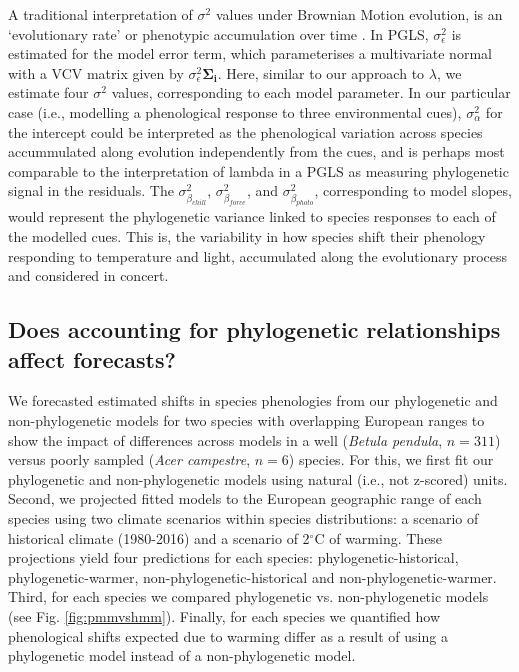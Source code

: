 \documentclass[11pt]{article}
\begin{document}
A traditional interpretation of $\sigma^2$ values under Brownian Motion evolution, is an `evolutionary rate' or phenotypic accumulation over time \citep{revell2008phylogenetic}. In PGLS, $\sigma_\epsilon^2$ is estimated for the model error term, which parameterises a multivariate normal with a VCV matrix given by $\sigma_\epsilon^2$$\boldsymbol{\Sigma_i}$. Here, similar to our approach to $\lambda$, we estimate four $\sigma^2$ values, corresponding to each model parameter. In our particular case (i.e., modelling a phenological response to three environmental cues), $\sigma_\alpha^2$ for the intercept could be interpreted as the phenological variation across species accummulated along evolution independently from the cues, and is perhaps most comparable to the interpretation of lambda in a PGLS as measuring phylogenetic signal in the residuals. The $\sigma_{\beta_{chill}}^2$, $\sigma_{\beta_{force}}^2$, and $\sigma_{\beta_{photo}}^2$, corresponding to model slopes, would represent the phylogenetic variance linked to species responses to each of the modelled cues. This is, the variability in how species shift their phenology responding to temperature and light, accumulated along the evolutionary process and considered in concert. 

\subsection*{Does accounting for phylogenetic relationships affect forecasts?}
We forecasted estimated shifts in species phenologies from our phylogenetic and non-phylogenetic models for two species with overlapping European ranges to show the impact of differences across models in a well (\emph{Betula pendula}, $n=311$) versus poorly sampled  (\emph{Acer campestre}, $n=6$) species. For this, we first fit our phylogenetic and non-phylogenetic models using natural (i.e., not z-scored) units. Second, we projected fitted models to the European geographic range of each species using two climate scenarios within species distributions: a scenario of historical climate (1980-2016) and a scenario of 2$^{\circ}$C of warming. These projections yield four predictions for each species: phylogenetic-historical, phylogenetic-warmer, non-phylogenetic-historical and non-phylogenetic-warmer. Third, for each species we compared phylogenetic vs. non-phylogenetic models (see Fig. \ref{fig:pmmvshmm}). Finally, for each species we quantified how phenological shifts expected due to warming differ as a result of using a phylogenetic model instead of a non-phylogenetic model.  
\end{document}
